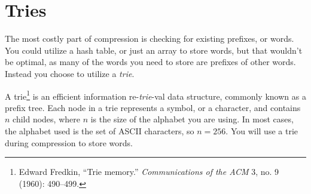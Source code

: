 \section{Tries}\label{sec:tries}

The most costly part of compression is checking for existing prefixes, or words.
You could utilize a hash table, or just an array to store words, but that
wouldn't be optimal, as many of the words you need to store are prefixes of
other words. Instead you choose to utilize a \emph{trie}.

A trie\footnote{Edward Fredkin, ``{T}rie memory.'' \emph{Communications of the
ACM} 3, no. 9 (1960): 490--499.} is an efficient information re-\emph{trie}-val
data structure, commonly known as a prefix tree. Each node in a trie represents
a symbol, or a character, and contains $n$ child nodes, where $n$ is the size of
the alphabet you are using. In most cases, the alphabet used is the set of ASCII
characters, so $n = 256$. You will use a trie during compression to store words.

\begin{center}

\end{center}


